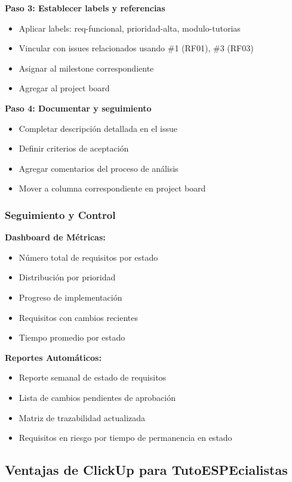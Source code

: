\documentclass[12pt,a4paper]{article}
\begin{document}
\textbf{Paso 3: Establecer labels y referencias}
\begin{itemize}
    \item Aplicar labels: req-funcional, prioridad-alta, modulo-tutorias
    \item Vincular con issues relacionados usando \#1 (RF01), \#3 (RF03)
    \item Asignar al milestone correspondiente
    \item Agregar al project board
\end{itemize}

\textbf{Paso 4: Documentar y seguimiento}
\begin{itemize}
    \item Completar descripción detallada en el issue
    \item Definir criterios de aceptación
    \item Agregar comentarios del proceso de análisis
    \item Mover a columna correspondiente en project board
\end{itemize}

\subsubsection{Seguimiento y Control}

\textbf{Dashboard de Métricas:}
\begin{itemize}
    \item Número total de requisitos por estado
    \item Distribución por prioridad
    \item Progreso de implementación
    \item Requisitos con cambios recientes
    \item Tiempo promedio por estado
\end{itemize}

\textbf{Reportes Automáticos:}
\begin{itemize}
    \item Reporte semanal de estado de requisitos
    \item Lista de cambios pendientes de aprobación
    \item Matriz de trazabilidad actualizada
    \item Requisitos en riesgo por tiempo de permanencia en estado
\end{itemize}

\subsection{Ventajas de ClickUp para TutoESPEcialistas}
\end{document}
